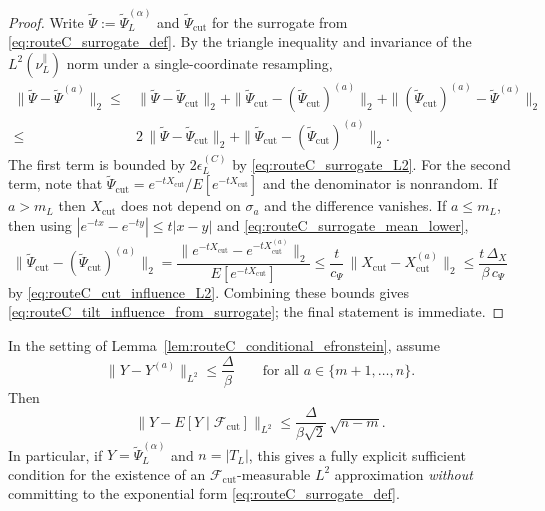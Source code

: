 \begin{proof}
Write $\widetilde\Psi:=\widetilde{\Psi}_L^{(\alpha)}$ and $\widetilde\Psi_{\mathrm{cut}}$ for the surrogate from \eqref{eq:routeC_surrogate_def}.
By the triangle inequality and invariance of the $L^2(\nu_L^{\parallel})$ norm under a single-coordinate resampling,
\[
\begin{aligned}
\|\widetilde\Psi-\widetilde\Psi^{(a)}\|_2
\le{}&\|\widetilde\Psi-\widetilde\Psi_{\mathrm{cut}}\|_2
+\|\widetilde\Psi_{\mathrm{cut}}-(\widetilde\Psi_{\mathrm{cut}})^{(a)}\|_2
+\|(\widetilde\Psi_{\mathrm{cut}})^{(a)}-\widetilde\Psi^{(a)}\|_2\\
\le{}&2\,\|\widetilde\Psi-\widetilde\Psi_{\mathrm{cut}}\|_2
+\|\widetilde\Psi_{\mathrm{cut}}-(\widetilde\Psi_{\mathrm{cut}})^{(a)}\|_2.
\end{aligned}
\]
The first term is bounded by $2\epsilon_L^{(C)}$ by \eqref{eq:routeC_surrogate_L2}.
For the second term, note that $\widetilde\Psi_{\mathrm{cut}}=e^{-tX_{\mathrm{cut}}}/E[e^{-tX_{\mathrm{cut}}}]$ and the denominator is nonrandom.
If $a>m_L$ then $X_{\mathrm{cut}}$ does not depend on $\sigma_a$ and the difference vanishes.
If $a\le m_L$, then using $|e^{-t x}-e^{-t y}|\le t|x-y|$ and \eqref{eq:routeC_surrogate_mean_lower},
\[
\|\widetilde\Psi_{\mathrm{cut}}-(\widetilde\Psi_{\mathrm{cut}})^{(a)}\|_2
=\frac{\|e^{-tX_{\mathrm{cut}}}-e^{-tX_{\mathrm{cut}}^{(a)}}\|_2}{E[e^{-tX_{\mathrm{cut}}}]}
\le \frac{t}{c_{\Psi}}\,\|X_{\mathrm{cut}}-X_{\mathrm{cut}}^{(a)}\|_2
\le \frac{t\,\Delta_X}{\beta\,c_{\Psi}}
\]
by \eqref{eq:routeC_cut_influence_L2}.
Combining these bounds gives \eqref{eq:routeC_tilt_influence_from_surrogate}; the final statement is immediate.
\end{proof}

\begin{corollary}\label{cor:routeC_L2_localization_from_outside_influences}
In the setting of Lemma~\ref{lem:routeC_conditional_efronstein}, assume
\begin{equation}\label{eq:routeC_outside_influence_bound}
\|Y-Y^{(a)}\|_{L^2}\le \frac{\Delta}{\beta}\qquad\text{for all }a\in\{m+1,\dots,n\}.
\end{equation}
Then
\begin{equation}\label{eq:routeC_L2_localization_bound}
\big\|Y-E[Y\mid\mathscr F_{\mathrm{cut}}]\big\|_{L^2}
\le
\frac{\Delta}{\beta\sqrt2}\,\sqrt{n-m}.
\end{equation}
In particular, if $Y=\widetilde\Psi_L^{(\alpha)}$ and $n=|T_L|$, this gives a fully explicit sufficient condition for the existence of an $\mathscr F_{\mathrm{cut}}$-measurable $L^2$ approximation
\emph{without} committing to the exponential form \eqref{eq:routeC_surrogate_def}.
\end{corollary}

